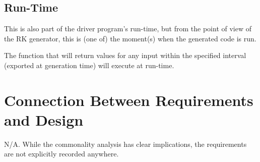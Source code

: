 \documentclass[12pt, titlepage]{article}
\begin{document}
\subsection{Run-Time}\label{ssec:run-time}
This is also part of the driver program's run-time, but from the point of view 
of the RK generator, this is (one of) the moment(s) when the generated code is 
run.

The function that will return values for any input within the specified 
interval (exported at generation time) will execute at run-time.




\section{Connection Between Requirements and Design} \label{SecConnection}

N/A. While the commonality analysis has clear implications, the requirements 
are not explicitly recorded anywhere. 
\end{document}
